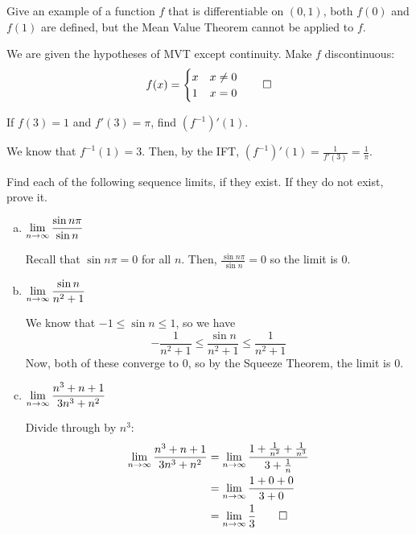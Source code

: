 \begin{prob}
  Give an example of a function $f$ that is differentiable on $(0,1)$,
  both $f(0)$ and $f(1)$ are defined, but the Mean Value Theorem cannot be applied to $f$.
\end{prob}
\begin{sol}
  We are given the hypotheses of MVT except continuity. Make $f$ discontinuous:
  \[ f(x) = \begin{cases}
      x & x \neq 0 \\
      1 & x = 0
    \end{cases} \qedhere \]
\end{sol}

\begin{prob} If $f(3) = 1$ and $f'(3) = \pi$, find $(f^{-1})'(1)$. \end{prob}
\begin{sol}
  We know that $f^{-1}(1) = 3$.
  Then, by the IFT, $(f^{-1})'(1) = \frac{1}{f'(3)} = \frac{1}{\pi}$.
\end{sol}



\begin{prob}
  Find each of the following sequence limits, if they exist.
  If they do not exist, prove it.
  \begin{enumerate}[(a)]
    \item $\displaystyle\lim_{n\to\infty} \frac{\sin n\pi}{\sin n}$
          \begin{sol}
            Recall that $\sin n\pi = 0$ for all $n$.
            Then, $\frac{\sin n\pi}{\sin n} = 0$ so the limit is 0.
          \end{sol}
    \item $\displaystyle\lim_{n\to\infty} \frac{\sin n}{n^2+1}$
          \begin{sol}
            We know that $-1 \leq \sin n \leq 1$, so we have
            \[ -\frac{1}{n^2+1} \leq \frac{\sin n}{n^2+1} \leq \frac{1}{n^2+1} \]
            Now, both of these converge to 0, so by the Squeeze Theorem, the limit is 0.
          \end{sol}
    \item $\displaystyle\lim_{n\to\infty} \frac{n^3+n+1}{3n^3+n^2}$
          \begin{sol}
            Divide through by $n^3$: \begin{align*}
              \lim_{n\to\infty} \frac{n^3+n+1}{3n^3+n^2}
               & = \lim_{n\to\infty} \frac{1+\frac{1}{n^2}+\frac{1}{n^3}}{3+\frac{1}{n}} \\
               & = \lim_{n\to\infty} \frac{1+0+0}{3+0}                                   \\
               & = \lim_{n\to\infty} \frac{1}{3} \qedhere
            \end{align*}
          \end{sol}
  \end{enumerate}
\end{prob}

